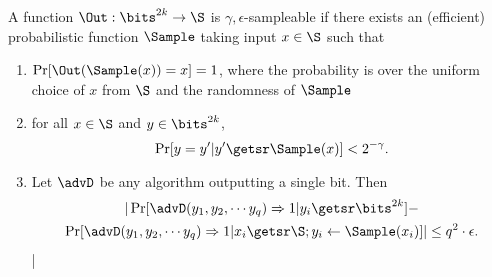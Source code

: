 A function $\Out: \bits^{2k} \to \S$ is $\gamma,\epsilon$-sampleable if there exists an (efficient) probabilistic function $\Sample$ taking input $x \in \S$ such that
\begin{enumerate}
	\item $\Pr[\Out(\Sample(x)) = x] = 1$, where the probability is over the uniform choice of $x$ from $\S$ and the randomness of $\Sample$
	\item for all $x \in \S$ and $y \in \bits^{2k}$,
	\[\Pr[ y = y' | y' \getsr \Sample(x)]< 2^{-\gamma}.\]
	\item Let $\advD$ be any algorithm outputting a single bit. Then 
	\begin{multline*}
|\Pr[\advD(y_1,y_2, \cdots y_q) \Rightarrow 1 | y_i \getsr \bits^{2k}] -\\ \Pr[\advD(y_1, y_2, \cdots y_q) \Rightarrow 1 |x_i \getsr \S; y_i \gets \Sample(x_i)]| \leq q^2\cdot\epsilon.
	\end{multline*}|
\end{enumerate}



